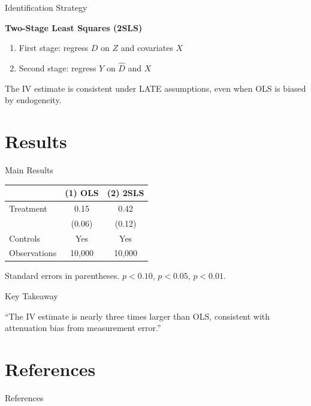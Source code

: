 \documentclass[9pt,english,aspectratio=169]{beamer}
\begin{document}
\begin{frame}{Identification Strategy}
  \begin{methodbox}
    \textbf{Two-Stage Least Squares (2SLS)}
    \begin{enumerate}
      \item First stage: regress $D$ on $Z$ and covariates $X$
      \item Second stage: regress $Y$ on $\hat{D}$ and $X$
    \end{enumerate}
  \end{methodbox}

  \vspace{1em}

  \begin{insightbox}
    The IV estimate is consistent under LATE assumptions, even when OLS is biased by endogeneity.
  \end{insightbox}
\end{frame}

\section{Results}

\begin{frame}{Main Results}
  \begin{table}[htbp]
    \centering
    \begin{tabular}{lcc}
      \toprule
      & (1) OLS & (2) 2SLS \\
      \midrule
      Treatment & 0.15\sym{**} & 0.42\sym{***} \\
                & (0.06) & (0.12) \\
      \midrule
      Controls & Yes & Yes \\
      Observations & 10{,}000 & 10{,}000 \\
      \bottomrule
    \end{tabular}
  \end{table}

  {\footnotesize Standard errors in parentheses. \sym{*} $p<0.10$, \sym{**} $p<0.05$, \sym{***} $p<0.01$.}
\end{frame}

\begin{frame}{Key Takeaway}
  \begin{quotebox}
    ``The IV estimate is nearly three times larger than OLS,
    consistent with attenuation bias from measurement error.''
  \end{quotebox}
\end{frame}

\section*{References}

\begin{frame}[allowframebreaks]{References}
  
\end{frame}
\end{document}
